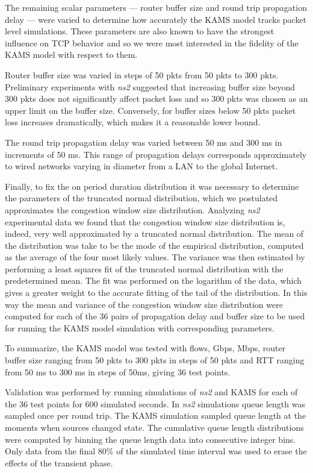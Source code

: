 \documentclass{IEEEtran}[10pt,letterpaper,conference]
\begin{document}
The remaining scalar parameters --- router buffer size and round trip propagation delay --- were varied to determine how accurately the KAMS model tracks packet level simulations. These parameters are also known to have the strongest influence on TCP behavior and so we were most interested in the fidelity of the KAMS model with respect to them.

Router buffer size was varied in steps of 50 pkts from 50 pkts to 300 pkts. Preliminary experiments with \emph{ns2} suggested that increasing buffer size beyond 300 pkts does not significantly affect packet loss and so 300 pkts was chosen as an upper limit on the buffer size. Conversely, for buffer sizes below 50 pkts packet loss increases dramatically, which makes it a reasonable lower bound.

The round trip propagation delay was varied between 50 ms and 300 ms in increments of 50 ms. This range of propagation delays corresponds approximately to wired networks varying in diameter from a LAN to the global Internet.

Finally, to fix the on period duration distribution it was necessary to determine the parameters of the truncated normal distribution, which we postulated approximates the congestion window size distribution. Analyzing \emph{ns2} experimental data we found that the congestion window size distribution is, indeed, very well approximated by a truncated normal distribution. The mean of the distribution was take to be the mode of the empirical distribution, computed as the average of the four most likely values. The variance was then estimated by performing a least squares fit of the truncated normal distribution with the predetermined mean. The fit was performed on the logarithm of the data, which gives a greater weight to the accurate fitting of the tail of the distribution. In this way the mean and variance of the congestion window size distribution were computed for each of the 36 pairs of propagation delay and buffer size to be used for running the KAMS model simulation with corresponding parameters.

To summarize, the KAMS model was tested with  flows, Gbps, Mbps, router buffer size ranging from 50 pkts to 300 pkts in steps of 50 pkts and RTT ranging from 50 ms to 300 ms in steps of 50ms, giving 36 test points.

Validation was performed by running simulations of \emph{ns2} and KAMS for each of the 36 test points for 600 simulated seconds. In \emph{ns2} simulations queue length was sampled once per round trip. The KAMS simulation sampled queue length at the moments when sources changed state. The cumulative queue length distributions were computed by binning the queue length data into consecutive integer bins. Only data from the final 80\% of the simulated time interval was used to erase the effects of the transient phase.
\end{document}
